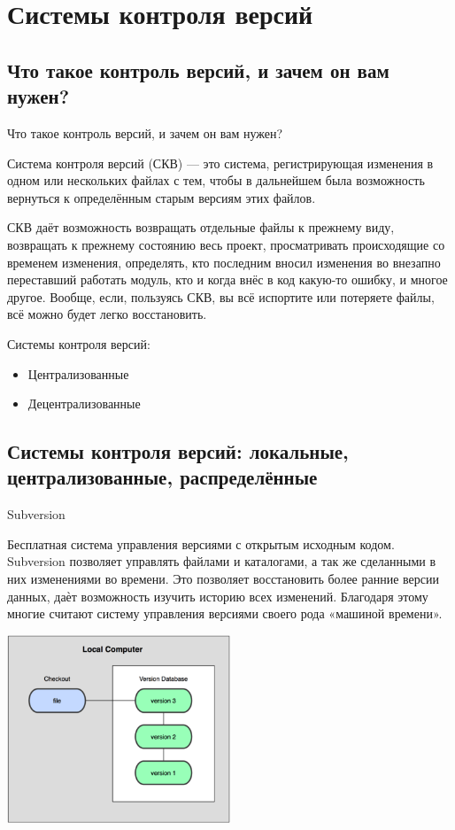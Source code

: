 \section{Системы контроля версий}
\subsection{Что такое контроль версий, и зачем он вам нужен?}

\begin{frame}[t]{Что такое контроль версий, и зачем он вам нужен?}

Система контроля версий (СКВ) — это система, регистрирующая изменения в одном или нескольких файлах с тем, 
чтобы в дальнейшем была возможность вернуться к определённым старым версиям этих файлов. 

СКВ даёт возможность возвращать отдельные файлы к прежнему виду, 
возвращать к прежнему состоянию весь проект, 
просматривать происходящие со временем изменения, определять, 
кто последним вносил изменения во внезапно переставший работать модуль, 
кто и когда внёс в код какую-то ошибку, и многое другое. 
Вообще, если, пользуясь СКВ, вы всё испортите или потеряете файлы, всё можно будет легко восстановить. 

Системы контроля версий:
\begin{itemize}
  \item Централизованные 
  \item Децентрализованные
\end{itemize}

\end{frame}

\subsection{Системы контроля версий: локальные, централизованные, распределённые}

\begin{frame}[t]{Subversion}

Бесплатная система управления версиями с открытым исходным кодом.
Subversion позволяет управлять файлами и каталогами, а так же сделанными в них изменениями
во времени. Это позволяет восстановить более ранние версии данных, даѐт возможность изучить
историю всех изменений. Благодаря этому многие считают систему управления версиями своего
рода «машиной времени».

\includegraphics[width=0.5\textwidth]{git/rcs.png}

\end{frame}

